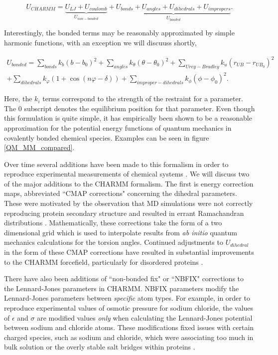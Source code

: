 \begin{equation}
	U_{CHARMM} = \underbrace{U_{LJ} + U_{coulomb}}_{U_{non-bonded}} + \underbrace{U_{bonds} + U_{angles} + U_{dihedrals} + U_{impropers}}_{U_{bonded} }.
	\label{CHARMM_effective_potential_eq}
\end{equation}

Interestingly, the bonded terms may be reasonably approximated by simple harmonic functions, with an exception we will discuuss shortly, 

\begin{equation}\label{bonded_eqs}
	\begin{aligned}
	U_{bonded} = \sum_{bonds} k_{b} (b-b_0)^2 + \sum_{angles} k_\theta(\theta-\theta_0)^2+ \sum_{Urey-Bradley} k_u(r_{UB}-r_{UB_0})^2   \\ + \sum_{dihedrals} k_\varphi (1+\cos(n \varphi - \delta)) + \sum_{improper-dihedrals}  k_{\phi} (\phi - \phi_0)^2.
\end{aligned}
\end{equation}

Here, the $k_i$ terms correspond to the strength of the restraint for a parameter. The $0$ subscript denotes the equilibrium position for that parameter. Even though this formulation is quite simple, it has empirically been shown to be a reasonable approximation for the potential energy functions of quantum mechanics in covalently bonded chemical species. Examples can be seen in figure \ref{QM_MM_compared}.

Over time several additions have been made to this formalism in order to reproduce experimental measurements of chemical systems \cite{mackerelljr.2004}. We will discuss two of the major additions to the CHARMM formalism. The first is energy correction maps, abbreviated ``CMAP corrections" concerning the dihedral parameters\cite{mackerell2004, mackerell2004a}. These were motivated by the observation that MD simulations were not correctly reproducing protein secondary structure and resulted in errant Ramachandran distributions \cite{ramachandran1963, mackerell2004}. Mathematically, these corrections take the form of a two dimensional grid which is used to interpolate results from \textit{ab initio} quantum mechanics calculations for the torsion angles. Continued adjustments to $U_{dihedral}$ in the form of these CMAP corrections have resulted in substantial improvements to the CHARMM forcefield, particularly for disordered proteins \cite{huang2016}. 

There have also been additions of ``non-bonded fix" or ``NBFIX"  corrections to the Lennard-Jones parameters in CHARMM. NBFIX parameters modify the Lennard-Jones parameters between \textit{specific} atom types. For example, in order to reproduce experimental values of osmotic pressure for sodium chloride, the values of $\epsilon$ and $\sigma$ are modified  values \textit{only} when calculating the Lennard-Jones potential between sodium and chloride atoms. These modifications fixed issues with certain charged species, such as sodium and chloride, which were associating too much in bulk solution or the overly stable salt bridges within proteins \cite{yoo2018, tolmachev2020, huang2016, savelyev2015}.

